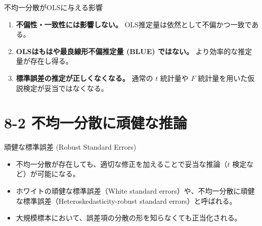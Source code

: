 \documentclass[
  ignorenonframetext,
]{beamer}
\providecommand{\tightlist}{%
  \setlength{\itemsep}{0pt}\setlength{\parskip}{0pt}}
\begin{document}
\begin{frame}{不均一分散がOLSに与える影響}
\label{ux4e0dux5747ux4e00ux5206ux6563ux304colsux306bux4e0eux3048ux308bux5f71ux97ff}
\begin{enumerate}
\tightlist
\item
  \textbf{不偏性・一致性には影響しない。}
  OLS推定量は依然として不偏かつ一致である。
\item
  \textbf{OLSはもはや最良線形不偏推定量 (BLUE) ではない。}
  より効率的な推定量が存在し得る。
\item
  \textbf{標準誤差の推定が正しくなくなる。} 通常の \(t\) 統計量や \(F\)
  統計量を用いた仮説検定が妥当ではなくなる。
\end{enumerate}
\end{frame}

\section{8-2
不均一分散に頑健な推論}\label{ux4e0dux5747ux4e00ux5206ux6563ux306bux9811ux5065ux306aux63a8ux8ad6}

\begin{frame}{頑健な標準誤差 (Robust Standard Errors)}
\label{ux9811ux5065ux306aux6a19ux6e96ux8aa4ux5dee-robust-standard-errors}
\begin{itemize}
\tightlist
\item
  不均一分散が存在しても、適切な修正を加えることで妥当な推論（\(t\)
  検定など）が可能になる。
\item
  ホワイトの頑健な標準誤差（White standard
  errors）や、不均一分散に頑健な標準誤差（Heteroskedasticity-robust
  standard errors）と呼ばれる。
\item
  大規模標本において、誤差項の分散の形を知らなくても正当化される。
\end{itemize}
\end{frame}
\end{document}
